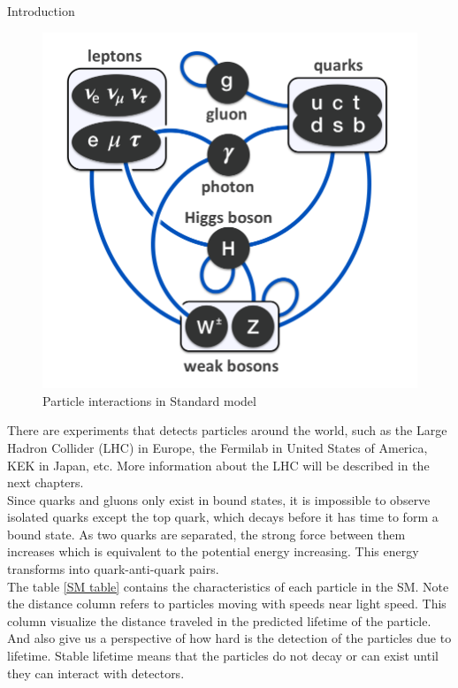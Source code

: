 \begin{chapter}{Introduction}
\begin{center}
    \begin{figure}[!htbp]
        \centering
        \includegraphics[scale=0.35]{Chapter1/sm.png}
        \caption{Particle interactions in Standard model}
        \label{sm}
    \end{figure}
\end{center}

There are experiments that detects particles around the world, such as the Large Hadron Collider (LHC) in Europe, the Fermilab  in United States of America, KEK in Japan, etc. More information about the LHC will be described in the next chapters.
\\
Since quarks and gluons only exist in bound states, it is impossible to observe isolated quarks except the top quark, which decays before it has time to form a
bound state. As two quarks are separated, the strong force between them increases
which is equivalent to the potential energy increasing. This energy transforms into
quark-anti-quark pairs. \\

The table \ref{SM table} contains the characteristics of each particle in the SM. Note the distance column refers to particles moving with speeds near light speed. This column visualize the distance traveled in the predicted lifetime of the particle. And also give us a perspective of how hard is the detection of the particles due to lifetime. Stable lifetime means that the particles do not decay or can exist until they can interact with detectors. \\


\end{chapter}

